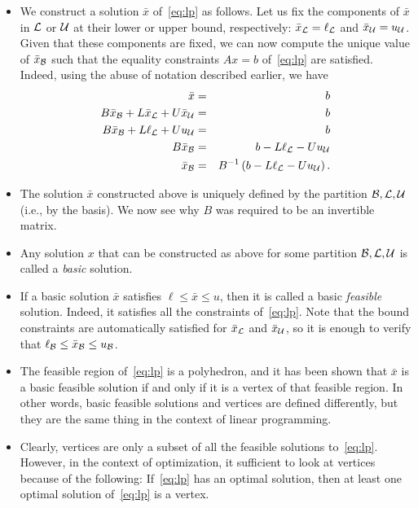 \begin{itemize}
\item We construct a solution $\bar x$ of~\eqref{eq:lp} as follows.
	Let us fix the components of $\bar x$ in $\mathcal{L}$ or $\mathcal{U}$
	at their lower or upper bound, respectively:
	$\bar x_{\mathcal{L}} = \ell_{\mathcal{L}}$ and
	$\bar x_{\mathcal{U}} = u_{\mathcal{U}}$.
	Given that these components are fixed,
	we can now compute the unique value of $\bar x_{\mathcal{B}}$ such
	that the equality constraints $A x = b$ of~\eqref{eq:lp}
	are satisfied.
	Indeed, using the abuse of notation described earlier,
	we have
\begin{eqnarray*}
	[ B \; | \; L \; | \; U ] \; \bar x & = & b \\
	B \bar x_{\B} + L \bar x_{\NL} + U \bar x_{\NU} & = & b \\
	B \bar x_{\B} + L \ell_{\NL} + U u_{\NU} & = & b \\
	B \bar x_{\B} & = & b - L \ell_{\NL} - U u_{\NU} \\
	\bar x_{\B} & = & B^{-1}
		\left( b - L \ell_{\NL} - U u_{\NU} \right). \\
\end{eqnarray*}

\item The solution $\bar x$ constructed above is uniquely
	defined by the partition $\mathcal{B}, \mathcal{L}, \mathcal{U}$
	(i.e., by the basis). We now see why $B$ was required
	to be an invertible matrix.

\item Any solution $x$ that can be constructed as above
	for some partition $\mathcal{B}, \mathcal{L}, \mathcal{U}$ is called a \emph{basic} solution.

\item If a basic solution $\bar x$ satisfies
	$\ell \leq \bar x \leq u$, then it is called
	a basic \emph{feasible} solution.
	Indeed, it satisfies all the constraints
	of~\eqref{eq:lp}.
	Note that the bound constraints are automatically satisfied
	for $\bar x_{\mathcal{L}}$ and $\bar x_{\mathcal{U}}$, so it is enough to
	verify that $\ell_{\mathcal{B}} \leq \bar x_{\mathcal{B}} \leq u_{\mathcal{B}}$.

\item The feasible region of~\eqref{eq:lp} is a polyhedron,
	and it has been shown that $\bar x$ is a basic feasible solution
	if and only if it is a vertex of that feasible region.
	In other words, basic feasible solutions and vertices are
	defined differently, but they are the same thing in the
	context of linear programming.

\item Clearly, vertices are only a subset of all the feasible
	solutions to~\eqref{eq:lp}. However, in the context of
	optimization, it sufficient to look at vertices because
	of the following: If~\eqref{eq:lp} has an optimal solution,
	then at least one optimal solution of~\eqref{eq:lp} is a vertex.
\end{itemize}

